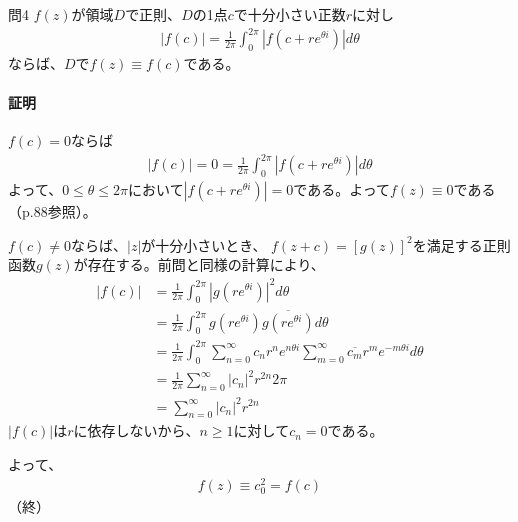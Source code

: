 \newpage
\begin{mysimplebox}{問4}
    $f(z)$が領域$D$で正則、$D$の1点$c$で十分小さい正数$r$に対し
    \begin{align*}
        |f(c)|=\frac{1}{2\pi}\int_{0}^{2\pi}|f(c+re^{\theta i})|d\theta
    \end{align*}
    ならば、$D$で$f(z)\equiv f(c)$である。
\end{mysimplebox}
\paragraph{証明}
$f(c)=0$ならば
\begin{align*}
    |f(c)|=0=\frac{1}{2\pi}\int_{0}^{2\pi}|f(c+re^{\theta i})|d\theta
\end{align*}
よって、$0\le\theta\le2\pi$において$|f(c+re^{\theta i})|=0$である。よって$f(z)\equiv0$である（p.88参照）。

$f(c)\neq0$ならば、$|z|$が十分小さいとき、
$f(z+c)=[g(z)]^2$を満足する正則函数$g(z)$が存在する。前問と同様の計算により、
\begin{align*}
    |f(c)|
    &=\frac{1}{2\pi}\int_{0}^{2\pi}|g(re^{\theta i})|^2d\theta\\
    &=\frac{1}{2\pi}\int_{0}^{2\pi}g(re^{\theta i})\overline{g(re^{\theta i})}d\theta\\
    &=\frac{1}{2\pi}\int_{0}^{2\pi}\sum_{n=0}^{\infty}c_nr^ne^{n\theta i}\sum_{m=0}^{\infty}\overline{c_m}r^me^{-m\theta i}d\theta\\
    &=\frac{1}{2\pi}\sum_{n=0}^{\infty}|c_n|^2r^{2n}2\pi\\
    &=\sum_{n=0}^{\infty}|c_n|^2r^{2n}
\end{align*}
$|f(c)|$は$r$に依存しないから、$n\ge1$に対して$c_n=0$である。

よって、
\begin{align*}
    f(z)\equiv c_0^2=f(c)
\end{align*}
（終）